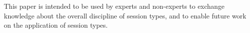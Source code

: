 %
%
%
%
%
%
%
%		


This paper is intended to be used by experts and non-experts
to exchange knowledge about the overall discipline of session types,
and to enable future work on the application of session types.


